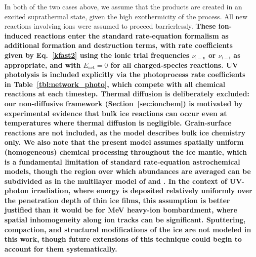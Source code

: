 \documentclass[journal=aesccq,manuscript=article,layout=twocolumn]{achemso}
\DeclareRobustCommand{\cb}[1]{\textbf{\textcolor{codexblue}{#1}}}
\begin{document}
\noindent
In both of the two cases above, we assume that the products are created in an excited suprathermal state, given the high exothermicity of the process. All new reactions involving ions were assumed to proceed barrierlessly. \cb{These ion-induced reactions enter the standard rate-equation formalism as additional formation and destruction terms, with rate coefficients given by Eq.~\eqref{kfast2} using the ionic trial frequencies $\nu_\mathrm{i-n}$ or $\nu_\mathrm{i-i}$ as appropriate, and with $E_\mathrm{act} = 0$ for all charged-species reactions. UV photolysis is included explicitly via the photoprocess rate coefficients in Table~\ref{tbl:network_photo}, which compete with all chemical reactions at each timestep. Thermal diffusion is deliberately excluded: our non-diffusive framework (Section~\ref{sec:ionchem}) is motivated by experimental evidence that bulk ice reactions can occur even at temperatures where thermal diffusion is negligible. Grain-surface reactions are not included, as the model describes bulk ice chemistry only. We also note that the present model assumes spatially uniform (homogeneous) chemical processing throughout the ice mantle, which is a fundamental limitation of standard rate-equation astrochemical models, though the region over which abundances are averaged can be subdivided as in the multilayer model of \citet{taquet_multilayer_2012} and \citet{vasyunin_formation_2017}. In the context of UV-photon irradiation, where energy is deposited relatively uniformly over the penetration depth of thin ice films, this assumption is better justified than it would be for MeV heavy-ion bombardment, where spatial inhomogeneity along ion tracks can be significant. Sputtering, compaction, and structural modifications of the ice are not modeled in this work, though future extensions of this technique could begin to account for them systematically.}
\end{document}
